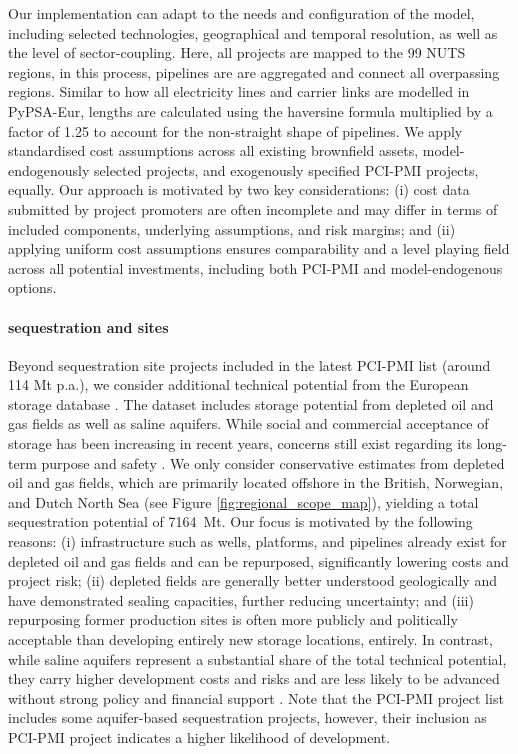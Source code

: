 \documentclass[preprint,12pt,sort&compress]{elsarticle}
\begin{document}
Our implementation can adapt to the needs and configuration of the model, including selected technologies, geographical and temporal resolution, as well as the level of sector-coupling. Here, all projects are mapped to the 99 NUTS regions, in this process, pipelines are are aggregated and connect all overpassing regions. Similar to how all electricity lines and carrier links are modelled in PyPSA-Eur, lengths are calculated using the haversine formula multiplied by a factor of 1.25 to account for the non-straight shape of pipelines.
We apply standardised cost assumptions \cite{zeyenPyPSATechnologydataV01012025} across all existing brownfield assets, model-endogenously selected projects, and exogenously specified PCI-PMI projects, equally. Our approach is motivated by two key considerations: (i) cost data submitted by project promoters are often incomplete and may differ in terms of included components, underlying assumptions, and risk margins; and (ii) applying uniform cost assumptions ensures comparability and a level playing field across all potential investments, including both PCI-PMI and model-endogenous options. 

\paragraph{ sequestration and  sites}
\label{sec:co2_sequestration_sites}
Beyond  sequestration site projects included in the latest PCI-PMI list (around 114 Mt p.a.), we consider additional technical potential from the European  storage database \cite{europeancommissionEuropeanCO2Storage2020,hofmannH2CO2Network2025}. The dataset includes storage potential from depleted oil and gas fields as well as saline aquifers. While social and commercial acceptance of  storage has been increasing in recent years, concerns still exist regarding its long-term purpose and safety \cite{vanalphenSocietalAcceptanceCarbon2007}.
We only consider conservative estimates from depleted oil and gas fields, which are primarily located offshore in the British, Norwegian, and Dutch North Sea (see Figure \ref{fig:regional_scope_map}), yielding a total sequestration potential of \SI{7164}{Mt}. Our focus is motivated by the following reasons: (i) infrastructure such as wells, platforms, and pipelines already exist for depleted oil and gas fields and can be repurposed, significantly lowering costs and project risk; (ii) depleted fields are generally better understood geologically and have demonstrated sealing capacities, further reducing uncertainty; and (iii) repurposing former production sites is often more publicly and politically acceptable than developing entirely new storage locations, entirely. In contrast, while saline aquifers represent a substantial share of the total technical potential, they carry higher development costs and risks and are less likely to be advanced without strong policy and financial support \cite{europeancommissionEuropeanCO2Storage2020}. Note that the PCI-PMI project list includes some aquifer-based sequestration projects, however, their inclusion as PCI-PMI project indicates a higher likelihood of development.
\end{document}
